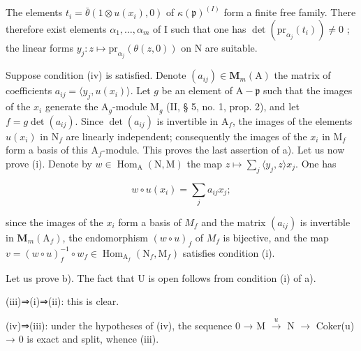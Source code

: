 The elements \(t_i = \bar{\theta}(1 \otimes u(x_i), 0)\) of \(\kappa(\mathfrak{p})^{(I)}\) form a finite free family. There therefore exist elements \(\alpha_1, \ldots, \alpha_{m}\) of I such that one has \(\det(\mathrm{pr}_{\alpha_j}(t_i)) \neq 0\) ; the linear forms \(y_j : z \mapsto \mathrm{pr}_{\alpha_j}(\theta(z, 0))\) on N are suitable.

Suppose condition (iv) is satisfied. Denote \((a_{ij}) \in \mathbf{M}_m(\mathrm{A})\) the matrix of coefficients \(a_{ij} = \langle y_j, u(x_i)\rangle\). Let \(g\) be an element of \(\mathrm{A} - \mathfrak{p}\) such that the images of the \(x_i\) generate the \(\mathrm{A}_g\)-module \(\mathrm{M}_g\) (II, § 5, no. 1, prop. 2), and let \(f = g \det(a_{ij})\). Since \(\det(a_{ij})\) is invertible in \(\mathrm{A}_f\), the images of the elements \(u(x_i)\) in \(\mathrm{N}_f\) are linearly independent; consequently the images of the \(x_i\) in \(\mathrm{M}_f\) form a basis of this \(\mathrm{A}_f\)-module. This proves the last assertion of a). Let us now prove (i). Denote by \(w \in \operatorname{Hom}_{\mathrm{A}}(\mathrm{N}, \mathrm{M})\) the map \(z \mapsto \sum_{j} \langle y_j, z\rangle x_j\). One has

\[
w \circ u (x _ {i}) = \sum_ {j} a _ {i j} x _ {j};
\]

since the images of the \(x_{i}\) form a basis of \(M_{f}\) and the matrix \((a_{ij})\) is invertible in \(\mathbf{M}_{m}(\mathrm{A}_{f})\), the endomorphism \((w \circ u)_{f}\) of \(M_{f}\) is bijective, and the map \(v = (w \circ u)_{f}^{-1} \circ w_{f} \in \operatorname{Hom}_{\mathrm{A}_{f}}(\mathrm{N}_{f}, \mathrm{M}_{f})\) satisfies condition (i).

Let us prove b). The fact that U is open follows from condition (i) of a).

(iii)⇒(i)⇒(ii): this is clear.

(iv)⇒(iii): under the hypotheses of (iv), the sequence 0 → M \(\xrightarrow{u}\) N \(\longrightarrow\) Coker(u) → 0 is exact and split, whence (iii).

